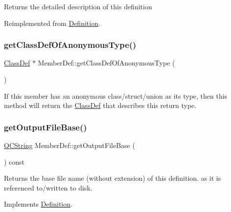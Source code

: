 Returns the detailed description of this definition 

Reimplemented from \mbox{\hyperlink{class_definition_a4775976f52978089164213f613dbeb18}{Definition}}.

\mbox{\label{class_member_def_a55dd478aba299892bdf1f4d22c21c95a}} 
\subsubsection{\texorpdfstring{getClassDefOfAnonymousType()}{getClassDefOfAnonymousType()}}
{\footnotesize\ttfamily \mbox{\hyperlink{class_class_def}{Class\+Def}} $\ast$ Member\+Def\+::get\+Class\+Def\+Of\+Anonymous\+Type (\begin{DoxyParamCaption}{ }\end{DoxyParamCaption})}

If this member has an anonymous class/struct/union as its type, then this method will return the \mbox{\hyperlink{class_class_def}{Class\+Def}} that describes this return type. \mbox{\label{class_member_def_afafa6a560b69558c5d3c8bba0424c939}} 
\subsubsection{\texorpdfstring{getOutputFileBase()}{getOutputFileBase()}}
{\footnotesize\ttfamily \mbox{\hyperlink{class_q_c_string}{Q\+C\+String}} Member\+Def\+::get\+Output\+File\+Base (\begin{DoxyParamCaption}{ }\end{DoxyParamCaption}) const\hspace{0.3cm}{\ttfamily [virtual]}}

Returns the base file name (without extension) of this definition. as it is referenced to/written to disk. 

Implements \mbox{\hyperlink{class_definition_acabecdc6bfda2015811eed5f3436322d}{Definition}}.

\mbox{\label{class_member_def_a96b40b99dcb42feaf5cb9de1bf784f0f}} 
